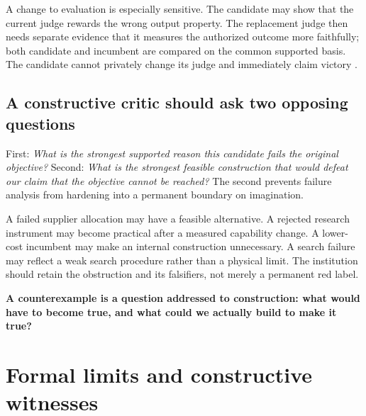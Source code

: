 \documentclass[11pt,a4paper]{article}
\begin{document}
A change to evaluation is especially sensitive. The candidate may show that the current judge rewards the wrong output property. The replacement judge then needs separate evidence that it measures the authorized outcome more faithfully; both candidate and incumbent are compared on the common supported basis. The candidate cannot privately change its judge and immediately claim victory \cite[Sec.~7]{ti}.

\subsection{A constructive critic should ask two opposing questions}
First: \emph{What is the strongest supported reason this candidate fails the original objective?} Second: \emph{What is the strongest feasible construction that would defeat our claim that the objective cannot be reached?} The second prevents failure analysis from hardening into a permanent boundary on imagination.

A failed supplier allocation may have a feasible alternative. A rejected research instrument may become practical after a measured capability change. A lower-cost incumbent may make an internal construction unnecessary. A search failure may reflect a weak search procedure rather than a physical limit. The institution should retain the obstruction and its falsifiers, not merely a permanent red label.

\begin{insight}
\textbf{A counterexample is a question addressed to construction: what would have to become true, and what could we actually build to make it true?}
\end{insight}

\section{Formal limits and constructive witnesses}
\end{document}
